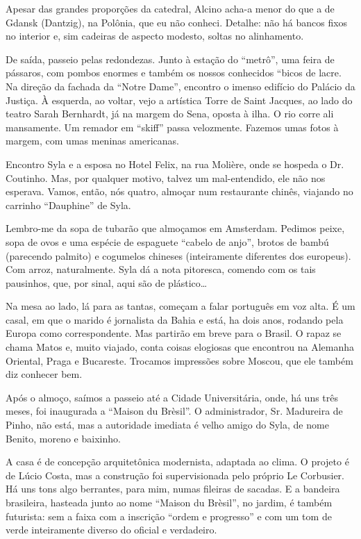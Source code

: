 Apesar das grandes proporções da catedral, Alcino acha-a menor do que a de Gdansk (Dantzig), na Polônia, que eu não conheci. Detalhe: não há bancos fixos no interior e, sim cadeiras de aspecto modesto, soltas no alinhamento.

De saída, passeio pelas redondezas. Junto à estação do “metrô”, uma feira de pássaros, com pombos enormes e também os nossos conhecidos “bicos de lacre. Na direção da fachada da “Notre Dame”, encontro o imenso edifício do Palácio da Justiça. À esquerda, ao voltar, vejo a artística Torre de Saint Jacques, ao lado do teatro Sarah Bernhardt, já na margem do Sena, oposta à ilha. O rio corre ali mansamente. Um remador em “skiff” passa velozmente. Fazemos umas fotos à margem, com umas meninas americanas.

Encontro Syla e a esposa no Hotel Felix, na rua Molière, onde se hospeda o Dr. Coutinho. Mas, por qualquer motivo, talvez um mal-entendido, ele não nos esperava. Vamos, então, nós quatro, almoçar num restaurante chinês, viajando no carrinho “Dauphine” de Syla.

Lembro-me da sopa de tubarão que almoçamos em Amsterdam. Pedimos peixe, sopa de ovos e uma espécie de espaguete “cabelo de anjo”, brotos de bambú (parecendo palmito) e cogumelos chineses (inteiramente diferentes dos europeus). Com arroz, naturalmente. Syla dá a nota pitoresca, comendo com os tais pausinhos, que, por sinal, aqui são de plástico\ldots

Na mesa ao lado, lá para as tantas, começam a falar português em voz alta. É um casal, em que o marido é jornalista da Bahia e está, ha dois anos, rodando pela Europa como correspondente. Mas partirão em breve para o Brasil. O rapaz se chama Matos e, muito viajado, conta coisas elogiosas que encontrou na Alemanha Oriental, Praga e Bucareste. Trocamos impressões sobre Moscou, que ele também diz conhecer bem.

Após o almoço, saímos a passeio até a Cidade Universitária, onde, há uns três meses, foi inaugurada a “Maison du Brèsil”. O administrador, Sr. Madureira de Pinho, não está, mas a autoridade imediata é velho amigo do Syla, de nome Benito, moreno e baixinho.

A casa é de concepção arquitetônica modernista, adaptada ao clima. O projeto é de Lúcio Costa, mas a construção foi supervisionada pelo próprio Le Corbusier. Há uns tons algo berrantes, para mim, numas fileiras de sacadas. E a bandeira brasileira, hasteada junto ao nome “Maison du Brèsil”, no jardim, é também futurista: sem a faixa com a inscrição “ordem e progresso” e com um tom de verde inteiramente diverso do oficial e verdadeiro.

